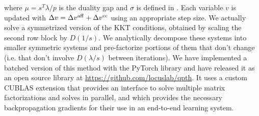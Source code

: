 where $\mu=s^T\lambda/p$ is the duality gap
and $\sigma$ is defined in \citet{mattingley2012cvxgen}.
Each variable $v$ is updated with
$\Delta v = \Delta v^{\rm  aff} + \Delta v^{\rm cc}$
using an appropriate step size.  We actually solve a symmetrized version of the
KKT conditions, obtained by scaling the second row block by $D(1/s)$.
We analytically decompose these systems into smaller
symmetric systems and pre-factorize portions of them
that don't change (i.e. that don't involve $D(\lambda/s)$
between iterations).
We have implemented a batched version of this method with the
PyTorch library \citep{paszke2017automatic}
and have released it as an open source library
at \url{https://github.com/locuslab/qpth}.
It uses a custom CUBLAS extension that provides an interface to solve multiple
matrix factorizations and solves in parallel, and which provides the necessary
backpropagation gradients for their use in an end-to-end learning system.

